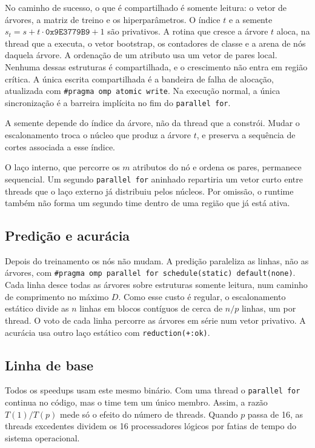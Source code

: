 \documentclass[12pt]{article}
\begin{document}
No caminho de sucesso, o que é compartilhado é somente leitura: o vetor de árvores,
a matriz de treino e os hiperparâmetros. O índice $t$ e a semente
$s_t = s + t \cdot \texttt{0x9E3779B9} + 1$ são privativos. A rotina que cresce a
árvore $t$ aloca, na thread que a executa, o vetor bootstrap, os contadores de classe
e a arena de nós daquela árvore. A ordenação de um atributo usa um vetor de pares
local. Nenhuma dessas estruturas é compartilhada, e o crescimento não entra em
região crítica. A única escrita compartilhada é a bandeira de falha de alocação,
atualizada com \texttt{\#pragma omp atomic write}. Na execução normal, a única
sincronização é a barreira implícita no fim do \texttt{parallel for}.

A semente depende do índice da árvore, não da thread que a constrói. Mudar o
escalonamento troca o núcleo que produz a árvore $t$, e preserva a sequência de
cortes associada a esse índice.

O laço interno, que percorre os $m$ atributos do nó e ordena os pares, permanece
sequencial. Um segundo \texttt{parallel for} aninhado repartiria um vetor curto
entre threads que o laço externo já distribuiu pelos núcleos. Por omissão, o runtime
também não forma um segundo time dentro de uma região que já está ativa.

\subsection{Predição e acurácia}

Depois do treinamento os nós não mudam. A predição paraleliza as linhas, não as
árvores, com \texttt{\#pragma omp parallel for schedule(static) default(none)}.
Cada linha desce todas as árvores sobre estruturas somente leitura, num caminho de
comprimento no máximo $D$. Como esse custo é regular, o escalonamento estático
divide as $n$ linhas em blocos contíguos de cerca de $n/p$ linhas, um por thread.
O voto de cada linha percorre as árvores em série num vetor privativo. A acurácia
usa outro laço estático com \texttt{reduction(+:ok)}.

\subsection{Linha de base}

Todos os speedups usam este mesmo binário. Com uma thread o \texttt{parallel for}
continua no código, mas o time tem um único membro. Assim, a razão $T(1)/T(p)$
mede só o efeito do número de threads. Quando $p$ passa de 16,
as threads excedentes dividem os 16 processadores lógicos por fatias de tempo do
sistema operacional.
\end{document}
